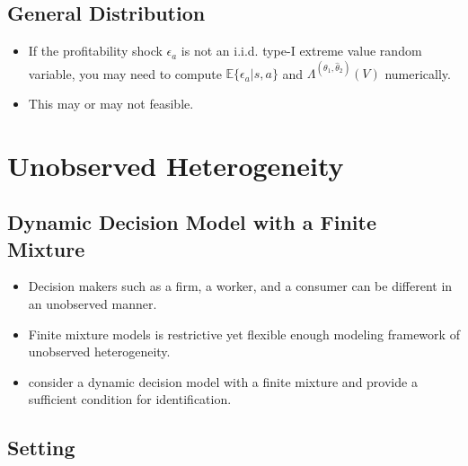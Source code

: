 \documentclass[
]{book}
\providecommand{\tightlist}{%
  \setlength{\itemsep}{0pt}\setlength{\parskip}{0pt}}
\begin{document}
\hypertarget{general-distribution}{%
\subsection{General Distribution}\label{general-distribution}}

\begin{itemize}
\tightlist
\item
  If the profitability shock \(\epsilon_a\) is not an i.i.d. type-I extreme value random variable, you may need to compute \(\mathbb{E}\{\epsilon_a|s, a\}\) and \(\Lambda^{(\theta_1, \hat{\theta}_2)}(V)\) numerically.
\item
  This may or may not feasible.
\end{itemize}

\hypertarget{unobserved-heterogeneity}{%
\section{Unobserved Heterogeneity}\label{unobserved-heterogeneity}}

\hypertarget{dynamic-decision-model-with-a-finite-mixture}{%
\subsection{Dynamic Decision Model with a Finite Mixture}\label{dynamic-decision-model-with-a-finite-mixture}}

\begin{itemize}
\tightlist
\item
  Decision makers such as a firm, a worker, and a consumer can be different in an unobserved manner.
\item
  Finite mixture models is restrictive yet flexible enough modeling framework of unobserved heterogeneity.
\item
  \citet{kasaharaNonparametricIdentificationFinite2009} consider a dynamic decision model with a finite mixture and provide a sufficient condition for identification.
\end{itemize}

\hypertarget{setting-1}{%
\subsection{Setting}\label{setting-1}}
\end{document}
